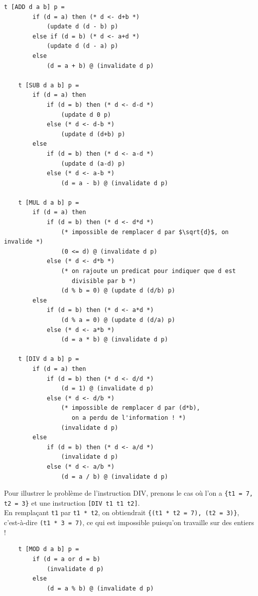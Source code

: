 \documentclass[french]{article}
\begin{document}
  \begin{lstlisting}[mathescape]
    t [ADD d a b] p =
        if (d = a) then (* d <- d+b *)
            (update d (d - b) p)
        else if (d = b) (* d <- a+d *)
            (update d (d - a) p)
        else
            (d = a + b) @ (invalidate d p)

    t [SUB d a b] p =
        if (d = a) then
            if (d = b) then (* d <- d-d *)
                (update d 0 p)
            else (* d <- d-b *)
                (update d (d+b) p)
        else
            if (d = b) then (* d <- a-d *)
                (update d (a-d) p)
            else (* d <- a-b *)
                (d = a - b) @ (invalidate d p)

    t [MUL d a b] p =
        if (d = a) then
            if (d = b) then (* d <- d*d *)
                (* impossible de remplacer d par $\sqrt{d}$, on invalide *)
                (0 <= d) @ (invalidate d p)
            else (* d <- d*b *)
                (* on rajoute un predicat pour indiquer que d est
                   divisible par b *)
                (d % b = 0) @ (update d (d/b) p)
        else
            if (d = b) then (* d <- a*d *)
                (d % a = 0) @ (update d (d/a) p)
            else (* d <- a*b *)
                (d = a * b) @ (invalidate d p)

    t [DIV d a b] p =
        if (d = a) then
            if (d = b) then (* d <- d/d *)
                (d = 1) @ (invalidate d p)
            else (* d <- d/b *)
                (* impossible de remplacer d par (d*b),
                   on a perdu de l'information ! *)
                (invalidate d p)
        else
            if (d = b) then (* d <- a/d *)
                (invalidate d p)
            else (* d <- a/b *)
                (d = a / b) @ (invalidate d p)
  \end{lstlisting}

  Pour illustrer le problème de l'instruction DIV, prenons le cas où l'on a \texttt{\{t1 = 7, t2 = 3\}} et une instruction \texttt{[DIV t1 t1 t2]}.\\
  En remplaçant \texttt{t1} par \texttt{t1 * t2}, on obtiendrait \texttt{\{(t1 * t2 = 7), (t2 = 3)\}}, c'est-à-dire \texttt{(t1 * 3 = 7)}, ce qui est impossible puisqu'on travaille sur des entiers !

  \begin{lstlisting}
    t [MOD d a b] p =
        if (d = a or d = b)
            (invalidate d p)
        else
            (d = a % b) @ (invalidate d p)
  \end{lstlisting}
\end{document}

